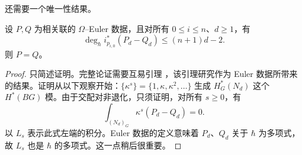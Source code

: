 还需要一个唯一性结果。
\begin{theorem}\label{thm:linked-euler-data-uniqueness}
设 $P,Q$ 为相关联的 $\Omega$--Euler 数据，且对所有 $0\le i\le n$、$d\ge1$，有
\[
\deg_\hbar i_{p_{i,0}}^*(P_d-Q_d)\le(n+1)d-2.
\]
则 $P=Q$。
\end{theorem}
\begin{proof}
只简述证明。完整论证需要互易引理 ，该引理研究作为 Euler 数据所带来的结果。证明从以下观察开始：$\{\kappa^s\}=\{1,\kappa,\kappa^2,\ldots\}$ 生成
$H_G^*(N_d)$ 这个 $H^*(BG)$ 模。由于交配对非退化，只须证明，对所有 $s\ge0$，有
\begin{equation}\label{eq:euler-data-uniqueness-integral}
\int_{(N_d)_G}\kappa^s(P_d-Q_d)=0.
\end{equation}
以 $L_s$ 表示此式左端的积分。Euler 数据的定义意味着 $P_d$、$Q_d$ 关于 $\hbar$ 为多项式，故 $L_s$ 也是 $\hbar$ 的多项式。这一点稍后很重要。


\end{proof}
